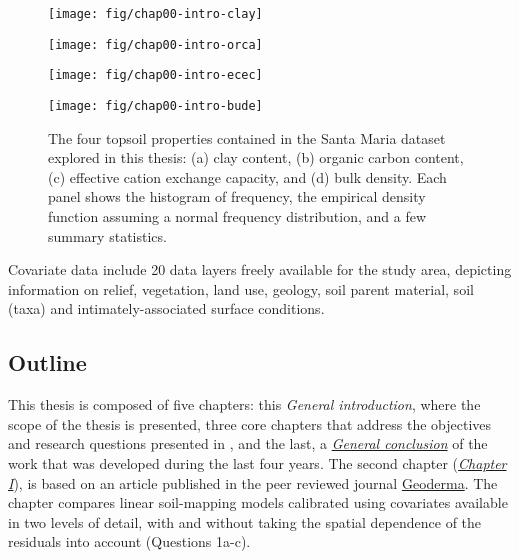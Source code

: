 \begin{figure}[!ht]
\centering
\begin{minipage}[b]{63mm}
\subcaption{}
\centering
\texttt{[image: fig/chap00-intro-clay]}
\end{minipage}
\begin{minipage}[b]{63mm}
\subcaption{}
\centering
\texttt{[image: fig/chap00-intro-orca]}
\end{minipage}
\begin{minipage}[b]{63mm}
\subcaption{}
\centering
\texttt{[image: fig/chap00-intro-ecec]}
\end{minipage}
\begin{minipage}[b]{63mm}
\subcaption{}
\centering
\texttt{[image: fig/chap00-intro-bude]}
\end{minipage}
\caption{The four topsoil properties contained in the Santa Maria dataset explored in this thesis:
(a) clay content, (b) organic carbon content, (c) effective cation exchange capacity, and (d)
bulk density. Each panel shows the histogram of frequency, the empirical density function assuming a
normal frequency distribution, and a few summary statistics.}
\label{fig:intro-soil-properties}
\end{figure}

Covariate data include 20 data layers freely available for the study area, 
depicting information on relief, vegetation, land use, geology, soil parent material, soil (taxa) 
and intimately-associated surface conditions.

\subsection{Outline}

This thesis is composed of five chapters: this \textit{General introduction}, where the scope of the
thesis is presented, three core chapters that address the objectives and research questions presented
in , and the last, a \hyperref[chap:conclusion]{\textit{General conclusion}}
of the work that was developed during the last four years. The second chapter (\hyperref[chap:chapter01]{\textit{Chapter
I}}), is based on an article published in the peer reviewed journal 
\href{http://www.journals.elsevier.com/geoderma/}{Geoderma}. The chapter compares linear soil-mapping
 models calibrated using covariates available in two levels of detail, with and without taking the 
spatial dependence of the residuals into account (Questions 1a-c).

